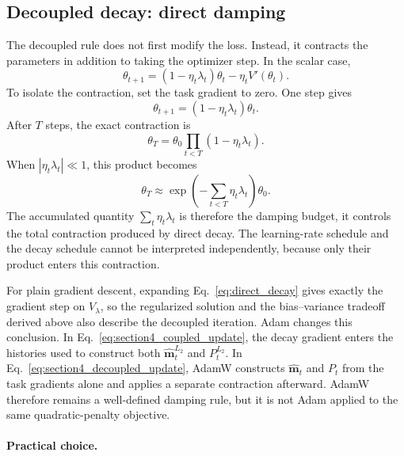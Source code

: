 \documentclass[11pt,letterpaper]{article}
\begin{document}
\subsection{Decoupled decay: direct damping}

The decoupled rule does not first modify the loss. Instead, it contracts the
parameters in addition to taking the optimizer step. In the scalar case,
\begin{equation}\label{eq:direct_decay}
  \theta_{t+1}
  =(1-\eta_t\lambda_t)\theta_t-\eta_tV'(\theta_t).
\end{equation}
To isolate the contraction, set the task gradient to zero. One step gives
\begin{equation}
  \theta_{t+1}=(1-\eta_t\lambda_t)\theta_t.
\end{equation}
After \(T\) steps, the exact contraction is
\begin{equation}\label{eq:decay_budget}
  \theta_T
  =\theta_0\prod_{t<T}(1-\eta_t\lambda_t).
\end{equation}
When \(|\eta_t\lambda_t|\ll1\), this product becomes
\begin{equation}
  \theta_T
  \approx
  \exp\!\left(-\sum_{t<T}\eta_t\lambda_t\right)\theta_0.
\end{equation}
The accumulated quantity \(\sum_t\eta_t\lambda_t\) is therefore the damping
budget, it controls the total contraction produced by direct decay. The
learning-rate schedule and the decay schedule cannot be interpreted
independently, because only their product enters this contraction.

For plain gradient descent, expanding Eq.~\eqref{eq:direct_decay} gives
exactly the gradient step on \(V_\lambda\), so the regularized solution and
the bias--variance tradeoff derived above also describe the decoupled
iteration. Adam changes this conclusion. In
Eq.~\eqref{eq:section4_coupled_update}, the decay gradient
enters the histories used to construct both \(\widehat{\bm m}_t^{L_2}\) and
\(P_t^{L_2}\). In Eq.~\eqref{eq:section4_decoupled_update}, AdamW constructs
\(\widehat{\bm m}_t\) and \(P_t\) from the task gradients alone and applies a
separate contraction afterward. AdamW therefore remains a well-defined
damping rule, but it is not Adam applied to the same quadratic-penalty
objective.

\paragraph{Practical choice.}
\end{document}
